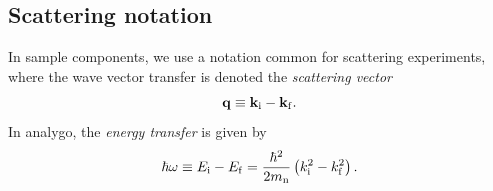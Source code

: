 
\subsection{Scattering notation}
In sample components, we use a notation common for scattering experiments,
where the wave vector transfer is denoted the {\em scattering vector}
\begin{equation} \label{eq:q-transfer}
{\bf q} \equiv {\bf k}_{\rm i} - {\bf k}_{\rm f} .
\end{equation}
In analygo, the {\em energy transfer} is given by
\begin{equation} \label{eq:w-transfer}
\hbar \omega \equiv E_{\rm i} - E_{\rm f} =
\frac{\hbar^2}{2 m_{\rm n}} \left( k_{\rm i}^2 - k_{\rm f}^2 \right) .
\end{equation}

